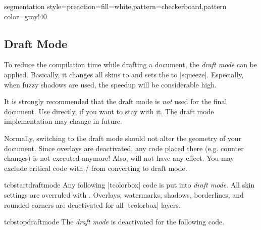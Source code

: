 \begin{dispExample*}{segmentation style={preaction={fill=white},pattern=checkerboard,pattern color=gray!40}}

\begin{mybox}
  \lipsum[2]
\end{mybox}
\end{dispExample*}


\clearpage
\subsection{Draft Mode}\label{subsec:draftmode}
To reduce the compilation time while drafting a document, the \emph{draft mode}
can be applied. Basically, it changes all skins to  and
sets the  to |squeeze|. Especially,
when fuzzy shadows are used, the speedup will be considerable high.

\begin{marker}
It is strongly recommended that the draft mode is \emph{not} used for the final document.
Use  directly, if you want to stay with it. The draft mode
implementation may change in future.
\end{marker}

\begin{marker}
Normally, switching to the draft mode should not alter the geometry of
your document. Since overlays are deactivated, any code placed there
(e.g. counter changes) is not executed anymore! Also, 
will not have any effect. You may exclude critical code with
 / 
from converting to draft mode.
\end{marker}


\begin{docCommand}{tcbstartdraftmode}{}
  Any following |tcolorbox| code is put into \emph{draft mode}. All skin
  settings are overruled with . Overlays, watermarks,
  shadows, borderlines, and rounded corners are deactivated for all |tcolorbox|
  layers.
\end{docCommand}

\begin{docCommand}{tcbstopdraftmode}{}
  The \emph{draft mode} is deactivated for the following code.
\end{docCommand}


